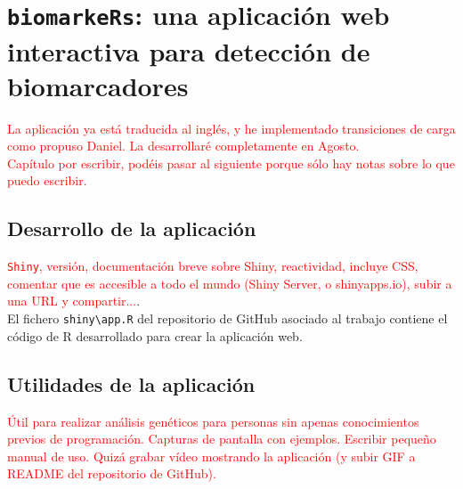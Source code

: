 \chapter{\texttt{biomarkeRs}: una aplicación web interactiva para detección de biomarcadores}

\textcolor{red}{La aplicación ya está traducida al inglés, y he implementado transiciones de carga como propuso Daniel. La desarrollaré completamente en Agosto.}\\

\textcolor{red}{Capítulo por escribir, podéis pasar al siguiente porque sólo hay notas sobre lo que puedo escribir.}

\section{Desarrollo de la aplicación}

\textcolor{red}{\texttt{Shiny}, versión, documentación breve sobre Shiny, reactividad, incluye CSS, comentar que es accesible a todo el mundo (Shiny Server, o shinyapps.io), subir a una URL y compartir...}.\\

El fichero \texttt{shiny\textbackslash app.R} del repositorio de GitHub asociado al trabajo \cite{Redondo-Sanchez2020}  contiene el código de R desarrollado para crear la aplicación web.

\section{Utilidades de la aplicación}

\textcolor{red}{Útil para realizar análisis genéticos para personas sin apenas conocimientos previos de programación. Capturas de pantalla con ejemplos. Escribir pequeño manual de uso. Quizá grabar vídeo mostrando la aplicación (y subir GIF a README del repositorio de GitHub).}